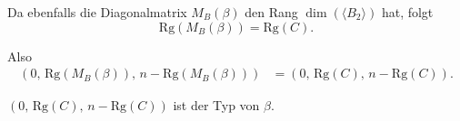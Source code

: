 \documentclass[a4paper,12pt]{article}
\begin{document}
\begin{enumerate}[label=\alph*)]
    Da ebenfalls die Diagonalmatrix $M_B(\beta)$ den Rang $\dim(\langle B_2 \rangle)$ hat, folgt
    \[
      \mathrm{Rg}(M_B(\beta)) = \mathrm{Rg}(C).
    \]

    Also
    \begin{align*}
      (0,\, \mathrm{Rg}(M_B(\beta)),\, n - \mathrm{Rg}(M_B(\beta)))
        &= (0,\, \mathrm{Rg}(C),\, n - \mathrm{Rg}(C)).
    \end{align*}

    $(0,\, \mathrm{Rg}(C),\, n - \mathrm{Rg}(C))$ ist der Typ von $\beta$.

\end{enumerate}
\end{document}
